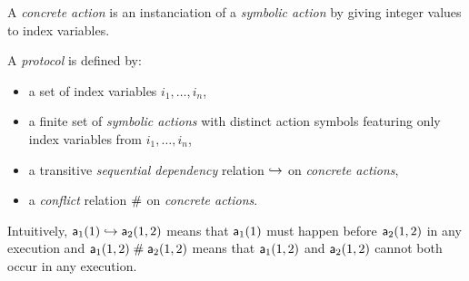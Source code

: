 \begin{definition}
A \emph{concrete action} is an instanciation of a \emph{symbolic action} by giving integer values to index variables.
\end{definition}

\begin{definition}
  \label{def:proto}
  A \emph{protocol} is defined by:
  \begin{itemize}
    \item a set of index variables $i_1,\dots,i_n$,
    \item a finite set of \emph{symbolic actions} with distinct action symbols featuring only index variables from $i_1,\dots,i_n$,
    \item a transitive \emph{sequential dependency} relation $\hookrightarrow$ on \emph{concrete actions},
    \item a \emph{conflict} relation $\mathrel{\#}$ on \emph{concrete actions}.
  \end{itemize}
  Intuitively, $\textsf{a}_1(1)\hookrightarrow\textsf{a}_2(1,2)$ means that $\textsf{a}_1(1)$ must happen before $\textsf{a}_2(1,2)$ in any execution
  and $\textsf{a}_1(1,2)\mathrel{\#}\textsf{a}_2(1,2)$ means that $\textsf{a}_1(1,2)$ and $\textsf{a}_2(1,2)$ cannot both occur in any execution.
\end{definition}

